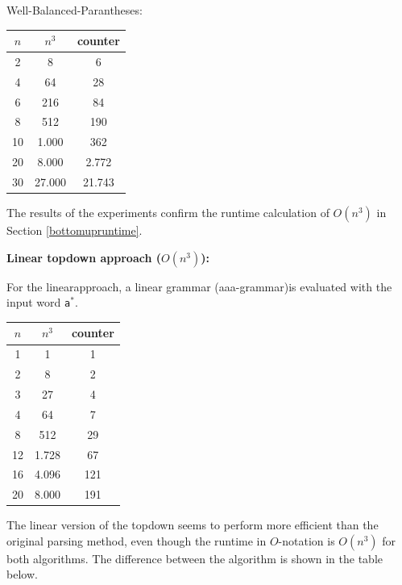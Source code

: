 \documentclass[a4paper, 11pt]{article}
\begin{document}
Well-Balanced-Parantheses: \\

\begin{center}

\begin{tabular}{|c|c|c|}
\hline
$n$ & $n^3$ & counter \\
\hline
2& 8 & 6\\
4& 64 & 28\\
6& 216 & 84\\
8& 512 & 190 \\
10& 1.000 & 362 \\
20& 8.000 & 2.772 \\
30& 27.000 & 21.743\\
\hline
\end{tabular}
\end{center}

    


The results of the experiments confirm the runtime calculation of $O(n^3)$ in Section \ref{bottomupruntime}.



\textbf{Linear topdown approach ($O(n^3)$):} 

For the linearapproach, a linear grammar (aaa-grammar)is evaluated with the input word \texttt{a$^*$}.

\begin{center}

\begin{tabular}{|c|c|c|}
\hline
$n$ & $n^3$ & counter \\
\hline
1& 1 & 1\\
2& 8 & 2\\
3& 27 & 4\\
4& 64 & 7\\
8& 512 & 29 \\
12& 1.728 & 67 \\
16& 4.096 & 121 \\
20& 8.000 & 191 \\
\hline
\end{tabular}
\end{center}

The linear version of the topdown seems to perform more efficient than the original parsing method, even though the runtime in $O$-notation is $O(n^3)$ for both algorithms. The difference between the algorithm is shown in the table below. 
\end{document}
